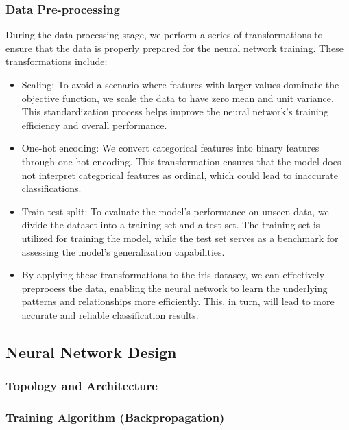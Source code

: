 \documentclass[conference]{inc/IEEEtran}
\begin{document}
\subsubsection{Data Pre-processing}
During the data processing stage, we perform a series of transformations to ensure that the data is properly prepared
for the neural network training. These transformations include:
\begin{itemize}
    \item Scaling: To avoid a scenario where features with larger values dominate the objective function, we scale the data to
    have zero mean and unit variance. This standardization process helps improve the neural network's training efficiency and
    overall performance.
    
    \item One-hot encoding: We convert categorical features into binary features through one-hot encoding. This transformation
    ensures that the model does not interpret categorical features as ordinal, which could lead to inaccurate classifications.
    
    \item Train-test split: To evaluate the model's performance on unseen data, we divide the dataset into a training set and a
    test set. The training set is utilized for training the model, while the test set serves as a benchmark for assessing the
    model's generalization capabilities.
    
    \item By applying these transformations to the iris datasey, we can effectively preprocess the data, enabling the neural
    network to learn the underlying patterns and relationships more efficiently. This, in turn, will lead to more accurate and
    reliable classification results.
\end{itemize}

\subsection{Neural Network Design}

\subsubsection{Topology and Architecture}

\subsubsection{Training Algorithm (Backpropagation)}
\end{document}
